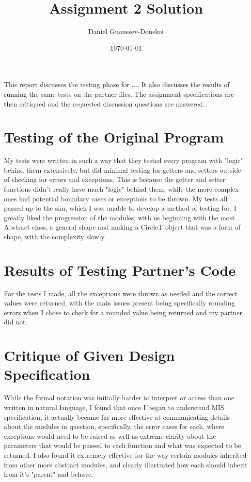 \documentclass[12pt]{article}
\title{Assignment 2 Solution}
\author{Daniel Guoussev-Donskoi}
\date{\today}
\begin{document}
\maketitle
This report discusses the testing phase for .... It also discusses the results
of running the same tests on the partner files. The assignment specifications
are then critiqued and the requested discussion questions are answered.
\section{Testing of the Original Program}
My tests were written in such a way that they tested every program with "logic" behind them extensively, but did minimal testing for getters and setters outside of checking for errors and exceptions. This is because the getter and setter functions didn't really have much "logic" behind them, while the more complex ones had potential boundary cases or exceptions to be thrown. My tests all passed up to the sim, which I was unable to develop a method of testing for. I greatly liked the progression of the modules, with us beginning with the most Abstract class, a general shape and making a CircleT object that was a form of shape, with the complexity slowly 
\section{Results of Testing Partner's Code}
For the tests I made, all the exceptions were thrown as needed and the correct values were returned, with the main issues present being specifically rounding errors when I chose to check for a rounded value being returned and my partner did not. 
\section{Critique of Given Design Specification}
While the formal notation was initially harder to interpret or access than one written in natural language, I found that once I began to understand MIS specification, it actually became far more effective at communicating details about the modules in question, specifically, the error cases for each, where exceptions would need to be raised as well as extreme clarity about the parameters that would be passed to each function and what was expected to be returned. I also found it extremely effective for the way certain modules inherited from other more abstract modules, and clearly illustrated how each should inherit from it's "parent" and behave.
\end{document}
